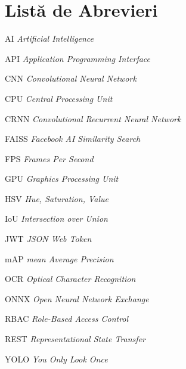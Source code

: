 \chapter*{Listă de Abrevieri}

\thispagestyle{front}

\begin{abbreviations}
    \color{gray}
    \item[AI] \textit{Artificial Intelligence}
    \item[API] \textit{Application Programming Interface}
    \item[CNN] \textit{Convolutional Neural Network}
    \item[CPU] \textit{Central Processing Unit}
    \item[CRNN] \textit{Convolutional Recurrent Neural Network}
    \item[FAISS] \textit{Facebook AI Similarity Search}
    \item[FPS] \textit{Frames Per Second}
    \item[GPU] \textit{Graphics Processing Unit}
    \item[HSV] \textit{Hue, Saturation, Value}
    \item[IoU] \textit{Intersection over Union}
    \item[JWT] \textit{JSON Web Token}
    \item[mAP] \textit{mean Average Precision}
    \item[OCR] \textit{Optical Character Recognition}
    \item[ONNX] \textit{Open Neural Network Exchange}
    \item[RBAC] \textit{Role-Based Access Control}
    \item[REST] \textit{Representational State Transfer}
    \item[YOLO] \textit{You Only Look Once}
\end{abbreviations}

\newpage \

